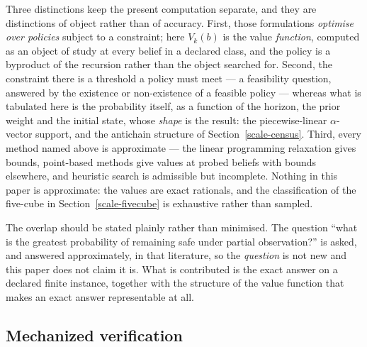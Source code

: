 \documentclass[10pt,twocolumn]{article}
\theoremstyle{plain}
\theoremstyle{definition}
\theoremstyle{remark}
\begin{document}
Three distinctions keep the present computation separate, and they are distinctions of
object rather than of accuracy. First, those formulations \emph{optimise over policies}
subject to a constraint; here \(V_k(b)\) is the value \emph{function}, computed as an
object of study at every belief in a declared class, and the policy is a byproduct of the
recursion rather than the object searched for. Second, the constraint there is a threshold
a policy must meet --- a feasibility question, answered by the existence or non-existence
of a feasible policy --- whereas what is tabulated here is the probability itself, as a
function of the horizon, the prior weight and the initial state, whose \emph{shape} is the
result: the piecewise-linear \(\alpha\)-vector support, and the antichain structure of
Section~\ref{scale-census}. Third, every method named above is approximate --- the linear
programming relaxation gives bounds, point-based methods give values at probed beliefs
with bounds elsewhere, and heuristic search is admissible but incomplete. Nothing in this
paper is approximate: the values are exact rationals, and the classification of the
five-cube in Section~\ref{scale-fivecube} is exhaustive rather than sampled.

The overlap should be stated plainly rather than minimised. The question ``what is the
greatest probability of remaining safe under partial observation?'' is asked, and answered
approximately, in that literature, so the \emph{question} is not new and this paper does
not claim it is. What is contributed is the exact answer on a declared finite instance,
together with the structure of the value function that makes an exact answer representable
at all.

\subsection{Mechanized verification}
\label{scale-mech}
\end{document}
